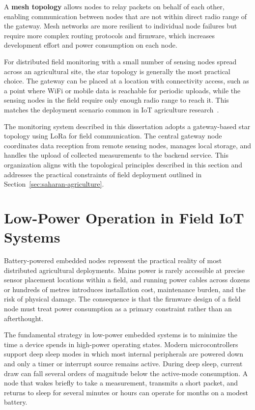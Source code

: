 A \textbf{mesh topology} allows nodes to relay packets on behalf of each other,
enabling communication between nodes that are not within direct radio range of the
gateway. Mesh networks are more resilient to individual node failures but require
more complex routing protocols and firmware, which increases development effort
and power consumption on each node.

For distributed field monitoring with a small number of sensing nodes spread
across an agricultural site, the star topology is generally the most practical
choice. The gateway can be placed at a location with connectivity access, such as
a point where WiFi or mobile data is reachable for periodic uploads, while the
sensing nodes in the field require only enough radio range to reach it. This
matches the deployment scenario common in IoT agriculture
research~\cite{villa2020iot_arable_farming}.

The monitoring system described in this dissertation adopts a gateway-based star
topology using LoRa for field communication. The central gateway node coordinates
data reception from remote sensing nodes, manages local storage, and handles the
upload of collected measurements to the backend service. This organization aligns
with the topological principles described in this section and addresses the
practical constraints of field deployment outlined in
Section~\ref{sec:saharan-agriculture}.

\section{Low-Power Operation in Field IoT Systems}
\label{sec:low-power}

Battery-powered embedded nodes represent the practical reality of most distributed
agricultural deployments. Mains power is rarely accessible at precise sensor
placement locations within a field, and running power cables across dozens or
hundreds of metres introduces installation cost, maintenance burden, and the risk
of physical damage. The consequence is that the firmware design of a field node
must treat power consumption as a primary constraint rather than an afterthought.

The fundamental strategy in low-power embedded systems is to minimize the time
a device spends in high-power operating states. Modern microcontrollers support
deep sleep modes in which most internal peripherals are powered down and only
a timer or interrupt source remains active. During deep sleep, current draw can
fall several orders of magnitude below the active-mode consumption. A node that
wakes briefly to take a measurement, transmits a short packet, and returns to
sleep for several minutes or hours can operate for months on a modest battery.

